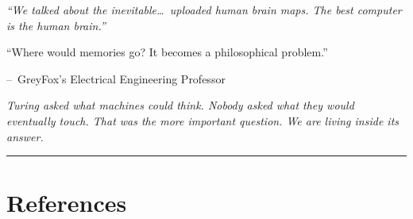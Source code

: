 \documentclass[11pt,a4paper]{article}
\renewenvironment{quote}
  {\list{}{\leftmargin=2.2em\rightmargin=2.2em\topsep=0.4em\parsep=0.3em}%
   \item\relax\itshape}
  {\endlist}
\newcommand{\attrib}[1]{\par\vspace{0.2em}\normalfont\small\hspace*{0em}--\ #1\par}
\begin{document}
\begin{quote}
``We talked about the inevitable\ldots\ uploaded human brain maps. The best computer is the human brain.''

``Where would memories go? It becomes a philosophical problem.''
\attrib{GreyFox's Electrical Engineering Professor}
\end{quote}

\textit{Turing asked what machines could think. Nobody asked what they would eventually touch. That was the more important question. We are living inside its answer.}

\vspace{0.6em}
\noindent\rule{\textwidth}{0.4pt}

\section*{References}
\end{document}
